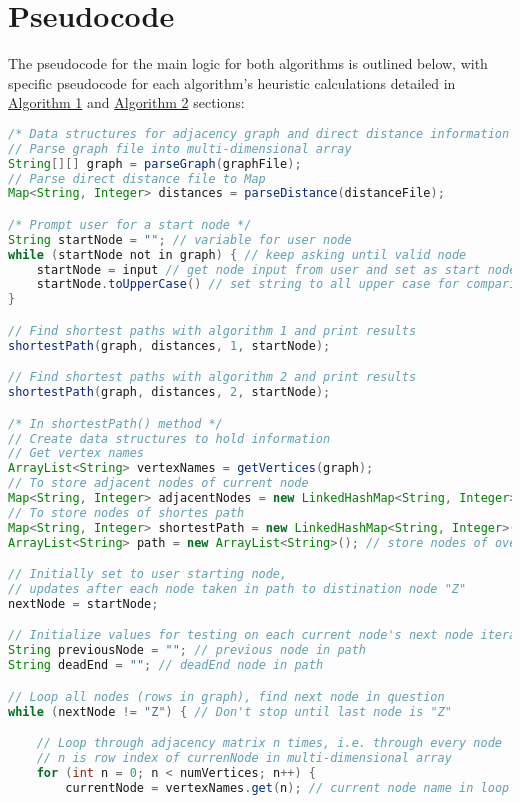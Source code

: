 \section*{Pseudocode}
\label{pseudocode}
The pseudocode for the main logic for both algorithms is outlined below, with specific pseudocode for each algorithm's heuristic calculations detailed in \hyperref[algo1]{Algorithm 1} and \hyperref[algo2]{Algorithm 2} sections:
\begin{lstlisting}[language=Java]
/* Data structures for adjacency graph and direct distance information */
// Parse graph file into multi-dimensional array
String[][] graph = parseGraph(graphFile);
// Parse direct distance file to Map
Map<String, Integer> distances = parseDistance(distanceFile);

/* Prompt user for a start node */
String startNode = ""; // variable for user node
while (startNode not in graph) { // keep asking until valid node
    startNode = input // get node input from user and set as start node
    startNode.toUpperCase() // set string to all upper case for comparison consistency
}

// Find shortest paths with algorithm 1 and print results
shortestPath(graph, distances, 1, startNode);

// Find shortest paths with algorithm 2 and print results
shortestPath(graph, distances, 2, startNode);

/* In shortestPath() method */
// Create data structures to hold information
// Get vertex names
ArrayList<String> vertexNames = getVertices(graph);
// To store adjacent nodes of current node
Map<String, Integer> adjacentNodes = new LinkedHashMap<String, Integer>();
// To store nodes of shortes path
Map<String, Integer> shortestPath = new LinkedHashMap<String, Integer>();
ArrayList<String> path = new ArrayList<String>(); // store nodes of overall path taken

// Initially set to user starting node,
// updates after each node taken in path to distination node "Z"
nextNode = startNode;

// Initialize values for testing on each current node's next node iteration
String previousNode = ""; // previous node in path
String deadEnd = ""; // deadEnd node in path

// Loop all nodes (rows in graph), find next node in question
while (nextNode != "Z") { // Don't stop until last node is "Z"

    // Loop through adjacency matrix n times, i.e. through every node
    // n is row index of currenNode in multi-dimensional array
    for (int n = 0; n < numVertices; n++) {
        currentNode = vertexNames.get(n); // current node name in loop


\end{lstlisting}
